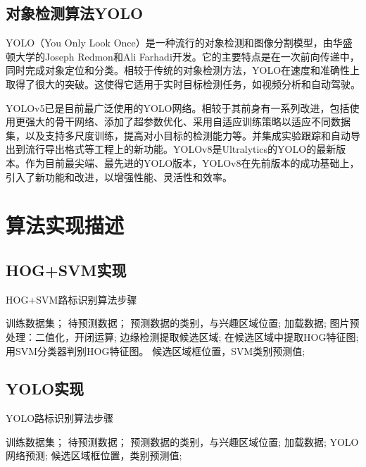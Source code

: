 \documentclass{article}
\begin{document}
\subsection{对象检测算法YOLO}
YOLO（You Only Look Once）\cite{ref9}是一种流行的对象检测和图像分割模型，由华盛顿大学的Joseph Redmon和Ali Farhadi开发。它的主要特点是在一次前向传递中，同时完成对象定位和分类。相较于传统的对象检测方法，YOLO在速度和准确性上取得了很大的突破。这使得它适用于实时目标检测任务，如视频分析和自动驾驶。

YOLOv5已是目前最广泛使用的YOLO网络。相较于其前身有一系列改进，包括使用更强大的骨干网络、添加了超参数优化、采用自适应训练策略以适应不同数据集，以及支持多尺度训练，提高对小目标的检测能力等。并集成实验跟踪和自动导出到流行导出格式等工程上的新功能。YOLOv8是Ultralytics的YOLO的最新版本。作为目前最尖端、最先进的YOLO版本，YOLOv8在先前版本的成功基础上，引入了新功能和改进，以增强性能、灵活性和效率。

\section{算法实现描述}
\subsection{HOG+SVM实现}
\begin{algorithm}[H]
    \caption{ HOG+SVM路标识别算法步骤}
    \begin{algorithmic}[1]
        \Require
        训练数据集；
        待预测数据；
        \Ensure
        预测数据的类别，与兴趣区域位置;
        \State 加载数据;
        \State 图片预处理：二值化，开闭运算;
        \State 边缘检测提取候选区域;
        \State 在候选区域中提取HOG特征图;
        \State 用SVM分类器判别HOG特征图。
        \Return
        候选区域框位置，SVM类别预测值;
    \end{algorithmic}
\end{algorithm}


\subsection{YOLO实现}

\begin{algorithm}[H]
    \caption{ YOLO路标识别算法步骤}
    \begin{algorithmic}[1]
        \Require
        训练数据集；
        待预测数据；
        \Ensure
        预测数据的类别，与兴趣区域位置;
        \State 加载数据;
        \State YOLO网络预测;
        \Return
        候选区域框位置，类别预测值;
    \end{algorithmic}
\end{algorithm}
\end{document}
